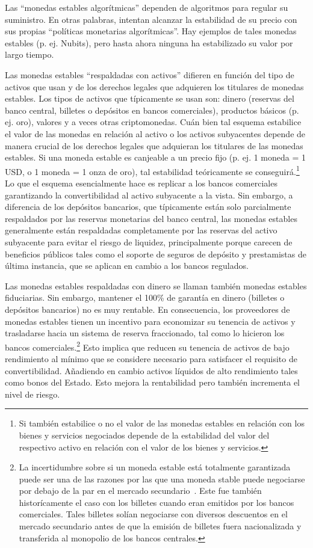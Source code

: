 \documentclass[10pt,spanish]{article}
\begin{document}
Las ``monedas estables algorítmicas'' dependen de algoritmos para
regular su suministro. En otras palabras, intentan alcanzar la
estabilidad de su precio con sus propias ``políticas monetarias
algorítmicas''. Hay ejemplos de tales monedas estables (p. ej. Nubits),
pero hasta ahora ninguna ha estabilizado su valor por largo tiempo.

Las monedas estables ``respaldadas con activos'' difieren en función del
tipo de activos que usan y de los derechos legales que adquieren los
titulares de monedas estables. Los tipos de activos que típicamente se
usan son: dinero (reservas del banco central, billetes o depósitos en
bancos comerciales), productos básicos (p. ej. oro), valores y a veces
otras criptomonedas. Cuán bien tal esquema estabilice el valor de las
monedas en relación al activo o los activos subyacentes depende de
manera crucial de los derechos legales que adquieran los titulares de
las monedas estables. Si una moneda estable es canjeable a un precio
fijo (p. ej. 1 moneda = 1 USD, o 1 moneda = 1 onza de oro), tal
estabilidad teóricamente se conseguirá.\footnote{Si también estabilice o
no el valor de las monedas estables en relación con los bienes y
servicios negociados depende de la estabilidad del valor del respectivo
activo en relación con el valor de los bienes y servicios.} Lo que el esquema
esencialmente hace es replicar a los bancos comerciales garantizando la
convertibilidad al activo subyacente a la vista. Sin embargo, a
diferencia de los depósitos bancarios, que típicamente están solo
parcialmente respaldados por las reservas monetarias del banco central,
las monedas estables generalmente están respaldadas completamente por
las reservas del activo subyacente para evitar el riesgo de liquidez,
principalmente porque carecen de beneficios públicos tales como el
soporte de seguros de depósito y prestamistas de última instancia, que
se aplican en cambio a los bancos regulados.

Las monedas estables respaldadas con dinero se llaman también monedas
estables fiduciarias. Sin embargo, mantener el 100\% de garantía en
dinero (billetes o depósitos bancarios) no es muy rentable. En
consecuencia, los proveedores de monedas estables tienen un incentivo
para economizar su tenencia de activos y trasladarse hacia un sistema de
reserva fraccionado, tal como lo hicieron los bancos comerciales.\footnote
{La incertidumbre sobre si un moneda estable está
totalmente garantizada puede ser una de las razones por las que una
moneda stable puede negociarse por debajo de la par en el mercado
secundario~\cite[véase][]{Lyons}. Este fue
también historícamente el caso con los billetes cuando eran emitidos
por los bancos comerciales. Tales billetes solían negociarse con
diversos descuentos en el mercado secundario antes de que la emisión
de billetes fuera nacionalizada y transferida al monopolio de los
bancos centrales.} Esto implica que reducen su tenencia de activos de
bajo rendimiento al mínimo que se considere necesario para satisfacer el
requisito de convertibilidad. Añadiendo en cambio activos líquidos de
alto rendimiento tales como bonos del Estado. Esto mejora la
rentabilidad pero también incrementa el nivel de riesgo.
\end{document}
